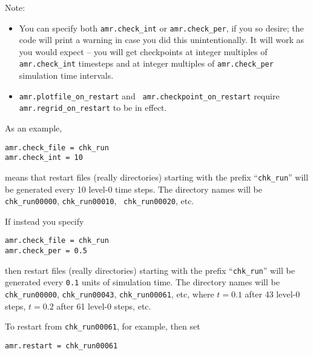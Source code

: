 Note:
\begin{itemize}

\item You can specify both {\tt amr.check\_int} or {\tt amr.check\_per},
  if you so desire; the code will print a warning in case you did this
  unintentionally. It will work as you would expect -- you will get checkpoints
  at integer multiples of {\tt amr.check\_int} timesteps and at integer
  multiples of {\tt amr.check\_per} simulation time intervals.

\item {\tt amr.plotfile\_on\_restart} and {\tt
  amr.checkpoint\_on\_restart} require {\tt amr.regrid\_on\_restart}
  to be in effect.
\end{itemize}

As an example,
\begin{lstlisting}
amr.check_file = chk_run
amr.check_int = 10
\end{lstlisting}
means that restart files (really directories) starting with the prefix
``{\tt chk\_run}'' will be generated every 10 level-0 time steps.  The
directory names will be {\tt chk\_run00000}, {\tt chk\_run00010}, {\tt
chk\_run00020}, etc.

If instead you specify
\begin{lstlisting}
amr.check_file = chk_run
amr.check_per = 0.5
\end{lstlisting}
then restart files (really directories) starting with the prefix
``{\tt chk\_run}'' will be generated every {\tt 0.1} units of
simulation time.  The directory names will be {\tt chk\_run00000},
{\tt chk\_run00043}, {\tt chk\_run00061}, etc, where $t = 0.1$ after
43 level-0 steps, $t = 0.2$ after 61 level-0 steps, etc.


To restart from {\tt chk\_run00061}, for example, then set 
\begin{lstlisting}
amr.restart = chk_run00061
\end{lstlisting}


